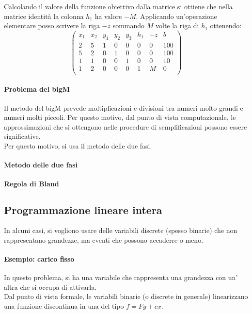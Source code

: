 \documentclass{article}
\begin{document}
Calcolando il valore della funzione obiettivo dalla matrice si ottiene che nella 
matrice identità la colonna $h_1$ ha valore  $-M$. Applicando un'operazione 
elementare posso scrivere la riga $-z$ sommando $M$ volte la riga 
di $h_1$ ottenendo:
\begin{equation*}
  \begin{pmatrix}
    x_1 & x_2 & y_1 & y_2 & y_3 & h_1 & -z & b\\
    2 & 5 & 1 & 0 & 0 & 0 & 0 & 100\\ 
    5 & 2 & 0 & 1 & 0 & 0 & 0 & 100\\ 
    1 & 1 & 0 & 0 & 1 & 0 & 0 & 10\\ 
    1 & 2 & 0 & 0 & 0 & 1 & M & 0\\ 
  \end{pmatrix}
\end{equation*}

\paragraph{Problema del bigM}
Il metodo del bigM prevede moltiplicazioni e divisioni tra numeri molto grandi 
e numeri molti piccoli. Per questo motivo, dal punto di vista computazionale, 
le approssimazioni che si ottengono nelle procedure di semplificazioni possono 
essere significative.\\ Per questo motivo, si usa il metodo delle due fasi.\\

\paragraph{Metodo delle due fasi} 

\paragraph{Regola di Bland}

\subsection{Programmazione lineare intera}
In alcuni casi, si vogliono usare delle variabili discrete (spesso binarie) che 
non rappresentano grandezze, ma eventi che possono accaderre o meno.

\paragraph{Esempio: carico fisso}
In questo problema, si ha una variabile che rappresenta una grandezza con un'
altra che si occupa di attivarla.\\ Dal punto di vista formale, le variabili 
binarie (o discrete in generale) linearizzano una funzione discontinua in una 
del tipo $f=Fy+cx$.
\end{document}
